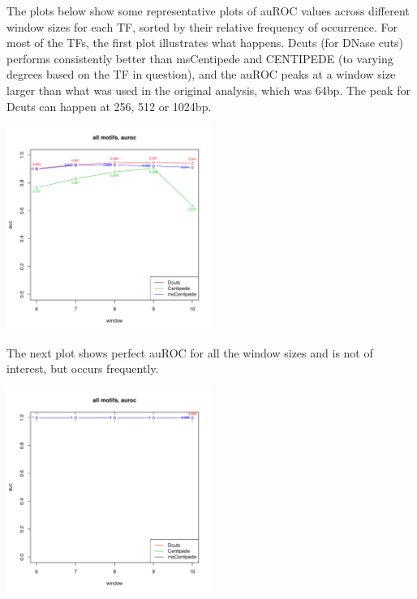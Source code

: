 \documentclass[12pt]{article}
\begin{document}
The plots below show some representative plots of auROC values across different window sizes for each TF, sorted by their relative frequency of occurrence. For most of the TFs, the first plot illustrates what happens. Dcuts (for DNase cuts) performs consistently better than msCentipede and CENTIPEDE (to varying degrees based on the TF in question), and the auROC peaks at a window size larger than what was used in the original analysis, which was 64bp. The peak for Dcuts can happen at 256, 512 or 1024bp. 
\begin{center}
\includegraphics[width=0.5\textwidth]{1_dcuts_better_and_plateaus.pdf}
\end{center}

The next plot shows perfect auROC for all the window sizes and is not of interest, but occurs frequently.
\begin{center}
\includegraphics[width=0.5\textwidth]{2_perfect_auc.pdf}
\end{center}
\end{document}
